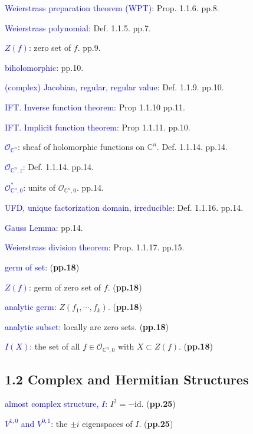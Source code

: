 \documentclass{book}
\numberwithin{equation}{subsection} %
\theoremstyle{definition}
\begin{document}
    \textcolor{blue}{Weierstrass preparation theorem (WPT)}:
    Prop. 1.1.6. pp.8.
    
    \textcolor{blue}{Weierstrass polynomial}: Def. 1.1.5. pp.7.
    
    \textcolor{blue}{$Z(f)$}: zero set of $f$. pp.9.
    
    \textcolor{blue}{biholomorphic}: pp.10.
    
    \textcolor{blue}{(complex) Jacobian, regular, regular value}: Def. 1.1.9. pp.10.
    
    \textcolor{blue}{IFT. Inverse function theorem}: Prop 1.1.10 pp.11.
    
    \textcolor{blue}{IFT. Implicit function theorem}: Prop 1.1.11. pp.10.
    
    \textcolor{blue}{$\mathcal{O}_{\mathbb{C}^n}$}:
    sheaf of holomorphic functions on $\mathbb{C}^n$. Def. 1.1.14. pp.14.
    
    \textcolor{blue}{$\mathcal{O}_{\mathbb{C}^n,z}$}: Def. 1.1.14. pp.14.
    
    \textcolor{blue}{$\mathcal{O}^*_{\mathbb{C}^n,0}$}:
    units of $\mathcal{O}_{\mathbb{C}^n,0}$. pp.14.
    
    \textcolor{blue}{UFD, unique factorization domain, irreducible}: 
    Def. 1.1.16. pp.14.
    
    \textcolor{blue}{Gauss Lemma}: pp.14.
    
    \textcolor{blue}{Weierstrass division theorem}: Prop. 1.1.17. pp.15.
    
    \textcolor{blue}{germ of set}: (\textbf{pp.18})

    \textcolor{blue}{$Z(f)$}: germ of zero set of $f$. (\textbf{pp.18})

    \textcolor{blue}{analytic germ}: $Z(f_1,\cdots,f_k)$. (\textbf{pp.18})

    \textcolor{blue}{analytic subset}: locally are zero sets. (\textbf{pp.18})

    \textcolor{blue}{$I(X)$}: the set of all $f\in
    \mathcal{O}_{\mathbb{C}^n,0}$ with $X\subset Z(f)$. (\textbf{pp.18})
    \subsection{1.2 Complex and Hermitian Structures}
    \textcolor{blue}{almost complex structure, $I$}: $I^2=-\text{id}$.
    (\textbf{pp.25})

    \textcolor{blue}{$V^{1,0}$ and $V^{0,1}$}: the $\pm i$ eigenspaces 
    of $I$.
    (\textbf{pp.25})
\end{document}
